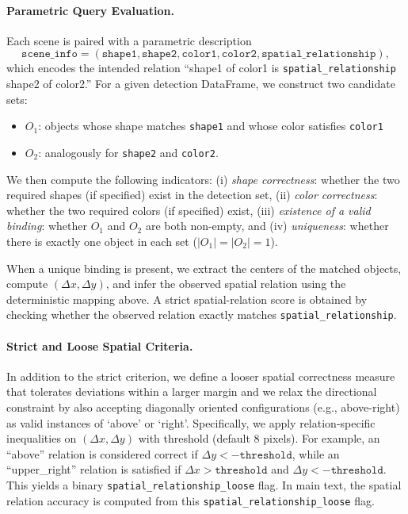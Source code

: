 \documentclass[10pt,twocolumn,letterpaper]{article}
\begin{document}
\paragraph{Parametric Query Evaluation.}
Each scene is paired with a parametric description
\[
\texttt{scene\_info} = (\texttt{shape1}, \texttt{shape2}, \texttt{color1}, \texttt{color2}, \texttt{spatial\_relationship}),
\]
which encodes the intended relation ``shape1 of color1 is \texttt{spatial\_relationship} shape2 of color2.'' For a given detection DataFrame, we construct two candidate sets:
\begin{itemize}
    \item $O_1$: objects whose shape matches \texttt{shape1} and whose color satisfies \texttt{color1}
    \item $O_2$: analogously for \texttt{shape2} and \texttt{color2}.
\end{itemize}
We then compute the following indicators:
(i) \emph{shape correctness}: whether the two required shapes (if specified) exist in the detection set,
(ii) \emph{color correctness}: whether the two required colors (if specified) exist,
(iii) \emph{existence of a valid binding}: whether $O_1$ and $O_2$ are both non-empty, and
(iv) \emph{uniqueness}: whether there is exactly one object in each set ($|O_1| = |O_2| = 1$).

When a unique binding is present, we extract the centers of the matched objects, compute $(\Delta x,\Delta y)$, and infer the observed spatial relation using the deterministic mapping above. A strict spatial-relation score is obtained by checking whether the observed relation exactly matches \texttt{spatial\_relationship}.

\paragraph{Strict and Loose Spatial Criteria.}
In addition to the strict criterion, we define a looser spatial correctness measure that tolerates deviations within a larger margin and we relax the directional constraint by also accepting diagonally oriented configurations (e.g., above-right) as valid instances of ‘above’ or ‘right’. 
Specifically, we apply relation-specific inequalities on $(\Delta x,\Delta y)$ with threshold (default 8 pixels). For example, an ``above'' relation is considered correct if $\Delta y < -\texttt{threshold}$, while an ``upper\_right'' relation is satisfied if $\Delta x > \texttt{threshold}$ and $\Delta y < -\texttt{threshold}$. This yields a binary \texttt{spatial\_relationship\_loose} flag. 
In main text, the spatial relation accuracy is computed from this \texttt{spatial\_relationship\_loose} flag.
\end{document}

